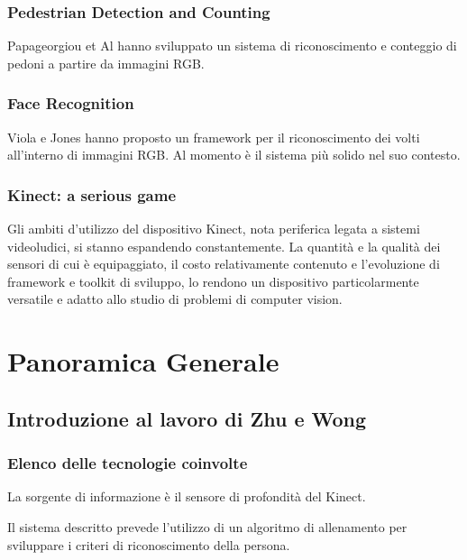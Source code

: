             \subsubsection{Pedestrian Detection and Counting}
            Papageorgiou et Al \cite{Papageorgiou98} hanno sviluppato un sistema di riconoscimento e conteggio di pedoni a partire da immagini RGB.

            \subsubsection{Face Recognition}
            Viola e Jones \cite{Viola04} hanno proposto un framework per il riconoscimento dei volti all'interno di immagini RGB. Al momento è il sistema più solido nel suo contesto.

            \subsubsection{Kinect: a serious game}
            Gli ambiti d'utilizzo del dispositivo Kinect, nota periferica legata a sistemi videoludici, si stanno espandendo constantemente. La quantità e la qualità dei sensori di cui è equipaggiato, il costo relativamente contenuto e l'evoluzione di framework e toolkit di sviluppo, lo rendono un dispositivo particolarmente versatile e adatto allo studio di problemi di computer vision.

    \section{Panoramica Generale}
    \label{sec:overview}
        \subsection{Introduzione al lavoro di Zhu e Wong}
            \subsubsection{Elenco delle tecnologie coinvolte}
                La sorgente di informazione è il sensore di profondità del Kinect.

                Il sistema descritto prevede l'utilizzo di un algoritmo di allenamento per sviluppare i criteri di riconoscimento della persona.

